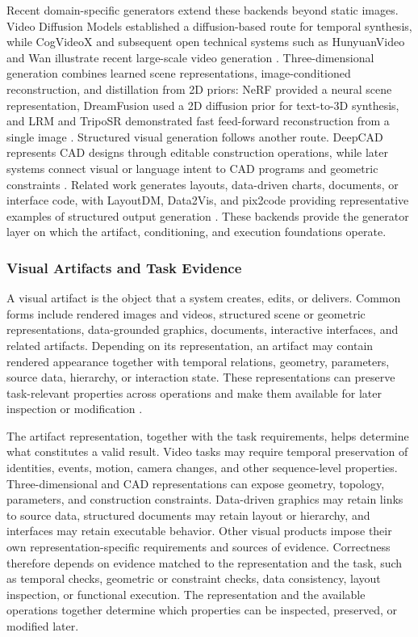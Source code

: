 Recent domain-specific generators extend these backends beyond static images. Video Diffusion Models established a diffusion-based route for temporal synthesis, while CogVideoX and subsequent open technical systems such as HunyuanVideo and Wan illustrate recent large-scale video generation \cite{ho2022videodiffusion,cogvideox2024,hunyuanvideo2024,wan2025}. Three-dimensional generation combines learned scene representations, image-conditioned reconstruction, and distillation from 2D priors: NeRF provided a neural scene representation, DreamFusion used a 2D diffusion prior for text-to-3D synthesis, and LRM and TripoSR demonstrated fast feed-forward reconstruction from a single image \cite{mildenhall2020nerf,poole2022dreamfusion,lrm2023,triposr2024}. Structured visual generation follows another route. DeepCAD represents CAD designs through editable construction operations, while later systems connect visual or language intent to CAD programs and geometric constraints \cite{wu2021deepcad,ocker2025ideatocad}. Related work generates layouts, data-driven charts, documents, or interface code, with LayoutDM, Data2Vis, and pix2code providing representative examples of structured output generation \cite{inoue2023layoutdm,dibia2018data2vis,beltramelli2017pix2code}. These backends provide the generator layer on which the artifact, conditioning, and execution foundations operate.

\subsubsection{Visual Artifacts and Task Evidence}

A visual artifact is the object that a system creates, edits, or delivers. Common forms include rendered images and videos, structured scene or geometric representations, data-grounded graphics, documents, interactive interfaces, and related artifacts. Depending on its representation, an artifact may contain rendered appearance together with temporal relations, geometry, parameters, source data, hierarchy, or interaction state. These representations can preserve task-relevant properties across operations and make them available for later inspection or modification \cite{yin2025spatiotemporal,mildenhall2020nerf,wu2021deepcad,dibia2018data2vis,beltramelli2017pix2code}.

The artifact representation, together with the task requirements, helps determine what constitutes a valid result. Video tasks may require temporal preservation of identities, events, motion, camera changes, and other sequence-level properties. Three-dimensional and CAD representations can expose geometry, topology, parameters, and construction constraints. Data-driven graphics may retain links to source data, structured documents may retain layout or hierarchy, and interfaces may retain executable behavior. Other visual products impose their own representation-specific requirements and sources of evidence. Correctness therefore depends on evidence matched to the representation and the task, such as temporal checks, geometric or constraint checks, data consistency, layout inspection, or functional execution. The representation and the available operations together determine which properties can be inspected, preserved, or modified later.

